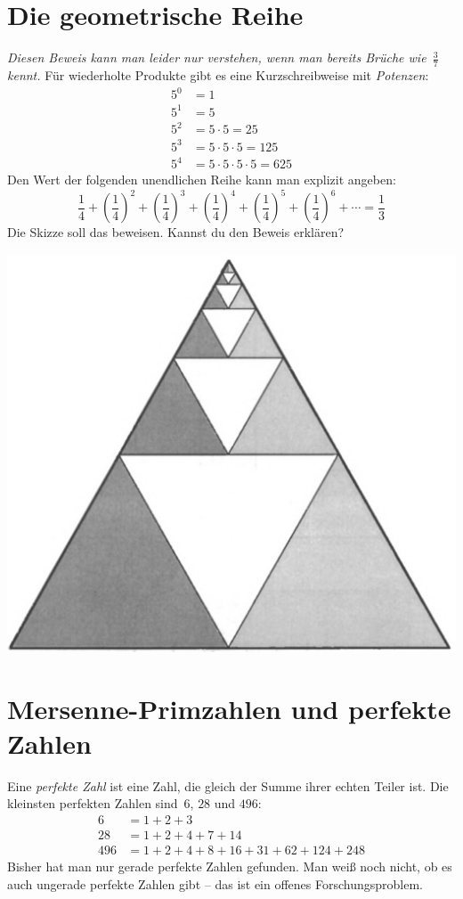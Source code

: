 \documentclass{../zirkelblatt}
\begin{document}
\vfill
\section*{Die geometrische Reihe}
\emph{Diesen Beweis kann man leider nur verstehen, wenn man bereits Brüche
wie~$\frac{3}{7}$ kennt.}
Für wiederholte Produkte gibt es eine Kurzschreibweise mit \emph{Potenzen}:
\begin{align*}
  5^0 &= 1 \\
  5^1 &= 5 \\
  5^2 &= 5 \cdot 5 = 25 \\
  5^3 &= 5 \cdot 5 \cdot 5 = 125 \\
  5^4 &= 5 \cdot 5 \cdot 5 \cdot 5 = 625
\end{align*}
Den Wert der folgenden unendlichen Reihe kann man
explizit angeben:
\[ \frac{1}{4} + \left(\frac{1}{4}\right)^2 + \left(\frac{1}{4}\right)^3 +
\left(\frac{1}{4}\right)^4 + \left(\frac{1}{4}\right)^5 +
\left(\frac{1}{4}\right)^6 + \cdots = \frac{1}{3} \]
Die Skizze soll das beweisen. Kannst du den Beweis erklären?
\begin{center}
\includegraphics[scale=0.3]{geometrische-reihe}
\end{center}


\vfill
\section*{Mersenne-Primzahlen und perfekte Zahlen}
Eine \emph{perfekte Zahl} ist eine Zahl, die gleich der Summe ihrer echten
Teiler ist. Die kleinsten perfekten Zahlen sind~$6$, $28$ und $496$:
\begin{align*}
  6 &= 1 + 2 + 3 \\
  28 &= 1 + 2 + 4 + 7 + 14 \\
  496 &= 1 + 2 + 4 + 8 + 16 + 31 + 62 + 124 + 248
\end{align*}
Bisher hat man nur gerade perfekte Zahlen gefunden. Man weiß noch nicht, ob es
auch ungerade perfekte Zahlen gibt -- das ist ein offenes Forschungsproblem.
\end{document}
